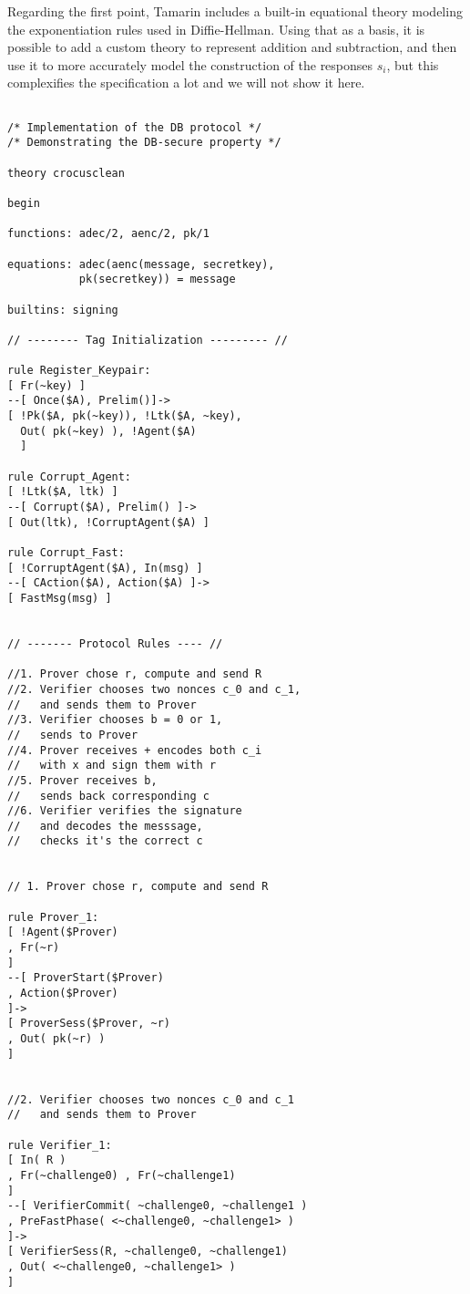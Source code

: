 Regarding the first point, Tamarin includes a built-in equational theory modeling the exponentiation rules used in Diffie-Hellman. Using that as a basis, it is possible to add a custom theory to represent addition and subtraction, and then use it to more accurately model the construction of the responses $s_i$, but this complexifies the specification a lot and we will not show it here.

\begin{lstlisting}

/* Implementation of the DB protocol */
/* Demonstrating the DB-secure property */

theory crocusclean

begin

functions: adec/2, aenc/2, pk/1

equations: adec(aenc(message, secretkey), 
           pk(secretkey)) = message

builtins: signing

// -------- Tag Initialization --------- //

rule Register_Keypair:
[ Fr(~key) ]
--[ Once($A), Prelim()]->
[ !Pk($A, pk(~key)), !Ltk($A, ~key), 
  Out( pk(~key) ), !Agent($A)
  ]

rule Corrupt_Agent:
[ !Ltk($A, ltk) ]
--[ Corrupt($A), Prelim() ]->
[ Out(ltk), !CorruptAgent($A) ]

rule Corrupt_Fast:
[ !CorruptAgent($A), In(msg) ]
--[ CAction($A), Action($A) ]->
[ FastMsg(msg) ]


// ------- Protocol Rules ---- //

//1. Prover chose r, compute and send R
//2. Verifier chooses two nonces c_0 and c_1,
//   and sends them to Prover
//3. Verifier chooses b = 0 or 1, 
//   sends to Prover
//4. Prover receives + encodes both c_i 
//   with x and sign them with r
//5. Prover receives b,
//   sends back corresponding c
//6. Verifier verifies the signature 
//   and decodes the messsage, 
//   checks it's the correct c


// 1. Prover chose r, compute and send R

rule Prover_1:
[ !Agent($Prover) 
, Fr(~r)
]
--[ ProverStart($Prover)
, Action($Prover)
]->
[ ProverSess($Prover, ~r) 
, Out( pk(~r) )
]


//2. Verifier chooses two nonces c_0 and c_1 
//   and sends them to Prover

rule Verifier_1:
[ In( R ) 
, Fr(~challenge0) , Fr(~challenge1)
]
--[ VerifierCommit( ~challenge0, ~challenge1 ) 
, PreFastPhase( <~challenge0, ~challenge1> )
]->
[ VerifierSess(R, ~challenge0, ~challenge1) 
, Out( <~challenge0, ~challenge1> )
]



\end{lstlisting}
